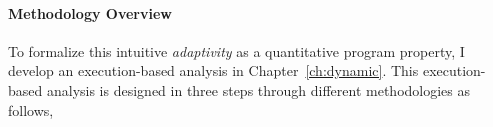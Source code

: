 \paragraph{Methodology Overview}
 To formalize this intuitive \emph{adaptivity} as a quantitative program property, 
I develop an execution-based analysis in Chapter~\ref{ch:dynamic}.
 This execution-based analysis is designed in three steps through different methodologies as follows,
